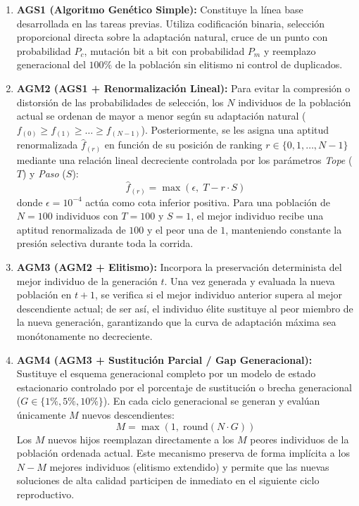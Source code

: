 \documentclass[11pt,letterpaper]{article}
\begin{document}
\begin{enumerate}
    \item \textbf{AGS1 (Algoritmo Genético Simple):} Constituye la línea base desarrollada en las tareas previas. Utiliza codificación binaria, selección proporcional directa sobre la adaptación natural, cruce de un punto con probabilidad $P_c$, mutación bit a bit con probabilidad $P_m$ y reemplazo generacional del $100\%$ de la población sin elitismo ni control de duplicados.

    \item \textbf{AGM2 (AGS1 + Renormalización Lineal):} Para evitar la compresión o distorsión de las probabilidades de selección, los $N$ individuos de la población actual se ordenan de mayor a menor según su adaptación natural ($f_{(0)} \ge f_{(1)} \ge \dots \ge f_{(N-1)}$). Posteriormente, se les asigna una aptitud renormalizada $\hat{f}_{(r)}$ en función de su posición de ranking $r \in \{0, 1, \dots, N-1\}$ mediante una relación lineal decreciente controlada por los parámetros \textit{Tope} ($T$) y \textit{Paso} ($S$):
    \begin{equation}
        \hat{f}_{(r)} = \max\left(\epsilon, \; T - r \cdot S\right)
        \label{eq:renormalizacion}
    \end{equation}
    donde $\epsilon = 10^{-4}$ actúa como cota inferior positiva. Para una población de $N = 100$ individuos con $T = 100$ y $S = 1$, el mejor individuo recibe una aptitud renormalizada de $100$ y el peor una de $1$, manteniendo constante la presión selectiva durante toda la corrida.

    \item \textbf{AGM3 (AGM2 + Elitismo):} Incorpora la preservación determinista del mejor individuo de la generación $t$. Una vez generada y evaluada la nueva población en $t+1$, se verifica si el mejor individuo anterior supera al mejor descendiente actual; de ser así, el individuo élite sustituye al peor miembro de la nueva generación, garantizando que la curva de adaptación máxima sea monótonamente no decreciente.

    \item \textbf{AGM4 (AGM3 + Sustitución Parcial / Gap Generacional):} Sustituye el esquema generacional completo por un modelo de estado estacionario controlado por el porcentaje de sustitución o brecha generacional ($G \in \{1\%, 5\%, 10\%\}$). En cada ciclo generacional se generan y evalúan únicamente $M$ nuevos descendientes:
    \begin{equation}
        M = \max\left(1, \; \text{round}(N \cdot G)\right)
        \label{eq:gap_m}
    \end{equation}
    Los $M$ nuevos hijos reemplazan directamente a los $M$ peores individuos de la población ordenada actual. Este mecanismo preserva de forma implícita a los $N - M$ mejores individuos (elitismo extendido) y permite que las nuevas soluciones de alta calidad participen de inmediato en el siguiente ciclo reproductivo.


\end{enumerate}
\end{document}
